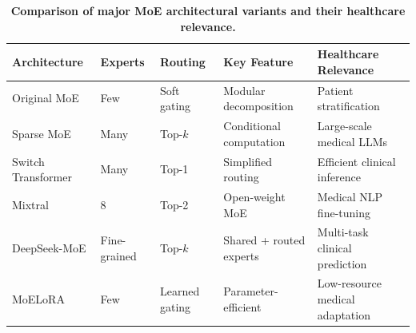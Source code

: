 
\begin{table}[htbp]
\centering
\caption{\textbf{Comparison of major MoE architectural variants and their healthcare relevance.}}
\label{tab:moe_variants}
\small
\begin{tabular}{@{}p{2.8cm}p{1.5cm}p{2cm}p{2.5cm}p{3.5cm}@{}}
\toprule
\textbf{Architecture} & \textbf{Experts} & \textbf{Routing} & \textbf{Key Feature} & \textbf{Healthcare Relevance} \\
\midrule
Original MoE \citep{jacobs1991adaptive} & Few & Soft gating & Modular decomposition & Patient stratification \\
\midrule
Sparse MoE \citep{shazeer2017outrageously} & Many & Top-$k$ & Conditional computation & Large-scale medical LLMs \\
\midrule
Switch Transformer \citep{fedus2022switch} & Many & Top-1 & Simplified routing & Efficient clinical inference \\
\midrule
Mixtral \citep{jiang2024mixtral} & 8 & Top-2 & Open-weight MoE & Medical NLP fine-tuning \\
\midrule
DeepSeek-MoE \citep{dai2024deepseekmoe} & Fine-grained & Top-$k$ & Shared + routed experts & Multi-task clinical prediction \\
\midrule
MoELoRA \citep{rai2024moe_lora} & Few & Learned gating & Parameter-efficient & Low-resource medical adaptation \\
\bottomrule
\end{tabular}
\end{table}
